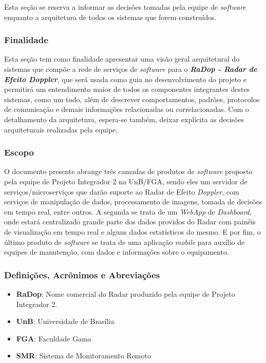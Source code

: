 Esta seção se reserva a informar as decisões tomadas pela equipe de \emph{software} enquanto a arquitetura de todos os sistemas que forem construídos.

\subsubsection{Finalidade}\label{finalidade}

Esta seção tem como finalidade apresentar uma visão geral arquitetural do sistemas que compõe a rede de serviços de \emph{software} para o \textbf{\emph{RaDop - Radar de Efeito Doppler}}, que será usada como
guia no desenvolvimento do projeto e permitirá um entendimento maior de todos os componentes integrantes destes sistemas, como um todo, além de descrever comportamentos, padrões, protocolos de comunicação e demais informações relacionadas ou correlacionadas. Com o detalhamento da arquitetura, espera-se também, deixar explícita as decisões arquiteturais realizadas pela equipe.

\subsubsection{Escopo}\label{escopo}

O documento presente abrange três camadas de produtos de \emph{software} proposto pela equipe de Projeto Integrador 2 na UnB/FGA, sendo eles um servidor de serviços/microserviços que darão suporte ao Radar de Efeito \emph{Doppler}, com serviços de manipulação de dados, processamento de imagens, tomada de decisões em tempo real, entre outros. A segunda se trata de um \emph{WebApp} de \emph{Dashboard}, onde estará centralizado grande parte dos dados providos do Radar com painéis de visualização em tempo real e alguns
dados estatísticos do mesmo. E por fim, o último produto de \emph{software} se trata de uma aplicação \emph{mobile} para auxílio de equipes de manutenção, com dados e informações sobre o equipamento.

\subsubsection{Definições, Acrônimos e Abreviações}\label{definicoes-acronimos-e-abreviacoes}

\begin{itemize}
\tightlist
\item
  \textbf{RaDop}: Nome comercial do Radar produzido pela equipe de
  Projeto Integrador 2.
\item
  \textbf{UnB}: Universidade de Brasília
\item
  \textbf{FGA}: Faculdade Gama
\item
  \textbf{SMR}: Sistema de Monitoramento Remoto
\end{itemize}

